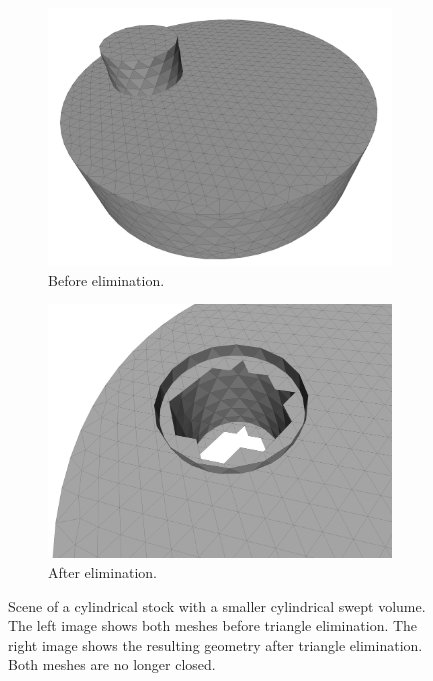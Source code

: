 \begin{figure}[!h]
	\centering
	\begin{subfigure}[b]{0.4\textwidth}
		\centering
		\includegraphics[width=\textwidth]{images/cylinders_classification_before}
		\caption{Before elimination.}
		\label{fig:cylinders_classification_before}
	\end{subfigure}
	\begin{subfigure}[b]{0.4\textwidth}
		\centering
		\includegraphics[width=\textwidth]{images/cylinders_classification_after}
		\caption{After elimination.}
		\label{fig:cylinders_classification_after}
	\end{subfigure}
	\caption[Triangle elimination]{
		Scene of a cylindrical stock with a smaller cylindrical swept volume.
		The left image shows both meshes before triangle elimination.
		The right image shows the resulting geometry after triangle elimination.
		Both meshes are no longer closed.
	}
	\label{fig:cylinders_classification}
\end{figure}


